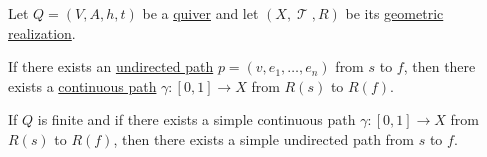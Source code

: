 \begin{proposition}\label{thm:quiver_geometric_realization_paths}
  Let \( Q = (V, A, h, t) \) be a \hyperref[def:quiver]{quiver} and let \( (X, \mscrT, R) \) be its \hyperref[def:quiver_geometric_realization]{geometric realization}.

  \begin{thmenum}
     If there exists an \hyperref[def:quiver_path/undirected]{undirected path} \( p = (v, e_1, \ldots, e_n) \) from \( s \) to \( f \), then there exists a \hyperref[def:parametric_curve]{continuous path} \( \gamma: [0, 1] \to X \) from \( R(s)  \) to \( R(f) \).

     If \( Q \) is finite and if there exists a simple continuous path \( \gamma: [0, 1] \to X \) from \( R(s)  \) to \( R(f) \), then there exists a simple undirected path from \( s \) to \( f \).
  \end{thmenum}
\end{proposition}
